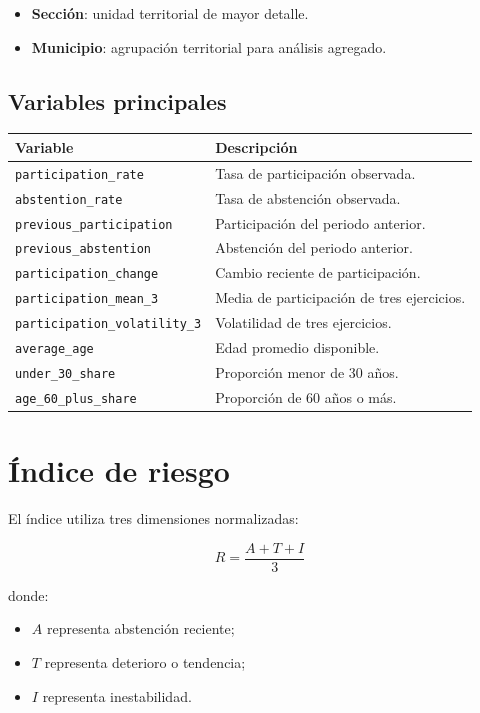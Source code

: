 \documentclass[11pt,a4paper]{article}
\begin{document}
\begin{itemize}
    \item \textbf{Sección}: unidad territorial de mayor detalle.
    \item \textbf{Municipio}: agrupación territorial para análisis agregado.
\end{itemize}

\subsection{Variables principales}

\begin{longtable}{p{}p{}}
\toprule
\textbf{Variable} & \textbf{Descripción}\\
\midrule
\texttt{participation\_rate} & Tasa de participación observada.\\
\texttt{abstention\_rate} & Tasa de abstención observada.\\
\texttt{previous\_participation} & Participación del periodo anterior.\\
\texttt{previous\_abstention} & Abstención del periodo anterior.\\
\texttt{participation\_change} & Cambio reciente de participación.\\
\texttt{participation\_mean\_3} & Media de participación de tres ejercicios.\\
\texttt{participation\_volatility\_3} & Volatilidad de tres ejercicios.\\
\texttt{average\_age} & Edad promedio disponible.\\
\texttt{under\_30\_share} & Proporción menor de 30 años.\\
\texttt{age\_60\_plus\_share} & Proporción de 60 años o más.\\
\bottomrule
\end{longtable}

\section{Índice de riesgo}

El índice utiliza tres dimensiones normalizadas:

\begin{equation}
R = \frac{A + T + I}{3}
\end{equation}

donde:

\begin{itemize}
    \item $A$ representa abstención reciente;
    \item $T$ representa deterioro o tendencia;
    \item $I$ representa inestabilidad.
\end{itemize}
\end{document}
